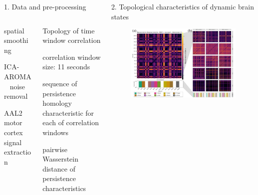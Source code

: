 \documentclass[final]{beamer}
\begin{document}
\begin{frame}{}
\begin{columns}
\begin{column}{0.65\textwidth}
\begin{block}{1. Data and pre-processing}
{{\begin{columns}
\begin{column}{0.49\textwidth}
\begin{itemize}
{                        \item spatial smoothing
                        \item ICA-AROMA~\cite{Pruim2015} noise removal
                        \item AAL2~\cite{Rolls2015} motor cortex signal extraction
                    }
                    \end{itemize}
                \end{column}
                \begin{column}{0.49\textwidth}
                    Topology of time window correlation
                    \begin{itemize}
                        \small{
                        \item correlation window size: 11 seconds
                        \item sequence of persistence homology characteristic for each of correlation windows
                        \item pairwise Wasserstein distance of persistence characteristics
                        }
                    \end{itemize}
                \end{column}
            \end{columns}
            } %
            } %
        
        \end{block}
    \end{column}
    
    \begin{column}{0.34\textwidth}
        \begin{block}{2. Topological characteristics of dynamic brain states}
            \begin{figure}[H]
                \centering
                \includegraphics[width=\linewidth]{images/2-wmat.pdf}
                \label{fig:preproc}
            \end{figure}
        \end{block}
    \end{column} %
\end{columns}



\end{frame}
\end{document}
